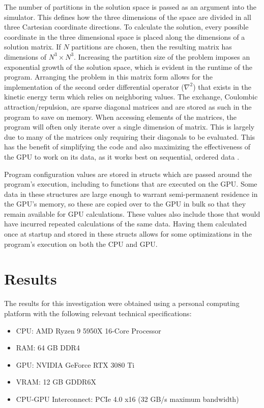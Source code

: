 \documentclass[conference, twoside]{IEEEtran}
\begin{document}
The number of partitions in the solution space is passed as an argument into the simulator. This defines how the three dimensions of the space are divided in all three Cartesian coordinate directions. To calculate the solution, every possible coordinate in the three dimensional space is placed along the dimensions of a solution matrix. If $N$ partitions are chosen, then the resulting matrix has dimensions of $N^3 \times N^3$. Increasing the partition size of the problem imposes an exponential growth of the solution space, which is evident in the runtime of the program. Arranging the problem in this matrix form allows for the implementation of the second order differential operator ($\nabla^2$) that exists in the kinetic energy term which relies on neighboring values. The exchange, Coulombic attraction/repulsion, are sparse diagonal matrices and are stored as such in the program to save on memory. When accessing elements of the matrices, the program will often only iterate over a single dimension of matrix. This is largely due to many of the matrices only requiring their diagonals to be evaluated. This has the benefit of simplifying the code and also maximizing the effectiveness of the GPU to work on its data, as it works best on sequential, ordered data \cite{special-purpose-hf-computer}.

Program configuration values are stored in structs which are passed around the program's execution, including to functions that are executed on the GPU. Some data in these structures are large enough to warrant semi-permanent residence in the GPU's memory, so these are copied over to the GPU in bulk so that they remain available for GPU calculations. These values also include those that would have incurred repeated calculations of the same data. Having them calculated once at startup and stored in these structs allows for some optimizations in the program's execution on both the CPU and GPU.

\section{Results}

The results for this investigation were obtained using a personal computing platform with the following relevant technical specifications:

\begin{itemize}
    \item CPU: AMD Ryzen 9 5950X 16-Core Processor
    \item RAM: 64 GB DDR4
    \item GPU: NVIDIA GeForce RTX 3080 Ti
    \item VRAM: 12 GB GDDR6X 
    \item CPU-GPU Interconnect: PCIe 4.0 x16 (32 GB/s maximum bandwidth)
\end{itemize}
\end{document}
